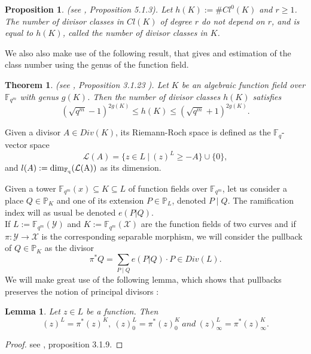 \documentclass[10pt]{article}
\newtheorem{thm}{Theorem}[]
\newtheorem{prop1}{Proposition}[]
\newtheorem{lem1}{Lemma}[]
\newcommand{\s}{\vspace{0.3cm}}
\newcommand{\cd}{\cdot}
\newcommand{\fqm}{\mathbb{F}_{q^m}}
\newcommand{\fq}{\mathbb{F}_q}
\newcommand{\su}{\subseteq}
\newcommand{\X}{\mathcal{X}}
\newcommand{\Y}{\mathcal{Y}}
\begin{document}
\s

\begin{prop1} \label{divclass} \rm (see \cite{Sti}, Proposition 5.1.3).  \it
Let $h(K) := \# Cl^0(K)$ and $r \geq 1$. The number of divisor classes in $Cl(K)$ of degree $r$ do not depend on $r$, and is equal to $h(K)$, called the number of divisor classes in $K$.
\end{prop1}

\s

We also also make use of the following result, that gives and estimation of the class number using the genus of the function field.

\s

\begin{thm} \rm (\color{red}see \cite{Tsf}, Proposition 3.1.23 \color{black}). \it \label{esti h(X)}
Let $K$ be an algebraic function field over $\fqm$ with genus $g(K)$. Then the number of divisor classes $h(K)$ satisfies
\[ (\sqrt{q^m}-1)^{2g(K)} \leq h(K) \leq (\sqrt{q^m}+1)^{2g(K)}.\]
\end{thm}
\s

Given a divisor $A \in Div(K)$, its Riemann-Roch space is defined as the $\fq$-vector space
\[\mathcal{L}(A) = \{z \in L \ | \ (z)^L \geq -A\} \cup \{0\},\]
and $l(A):= \rm{dim}_{\fq}(\mathcal{L}(A))$ as its dimension.




\s

Given a tower $\fqm(x) \su K \su L$ of function fields over $\fqm$, let us consider a place  $Q \in \mathbb{P}_K$ and one of its extension $P \in \mathbb{P}_L$, denoted $P\mid Q$. The ramification index will as usual be denoted $e(P|Q)$. \\
If $L := \fqm(\Y)$ and $K:=\fqm(\X)$ are the function fields of two curves and if $\pi : \Y \rightarrow \X$ is the corresponding separable morphism, we will consider the pullback of $Q \in \mathbb{P}_K$ as the divisor
\[\pi^*Q = \sum\limits_{P \mid Q} e(P|Q) \cd P \in Div(L).\]
We will make great use of the following lemma, which shows that pullbacks preserves the notion of principal divisors :

\s

\begin{lem1} \label{tiréarr}
Let $z \in L$ be a function. Then 
\[(z)^L = \pi^*(z)^K, \ (z)^L_0 = \pi^*(z)_0^K \ and \ (z)^L_{\infty} = \pi^*(z)^K_{\infty}.\]
\end{lem1} 

\s

\begin{proof}
see \cite{Sti}, proposition 3.1.9.
\end{proof}
\end{document}
